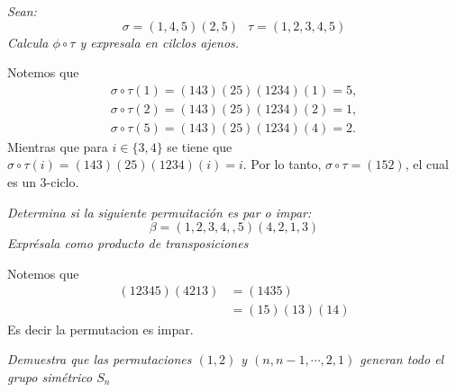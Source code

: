\documentclass[11pt,letterpaper]{article}
\begin{document}
\begin{tcolorbox}[
	title = \textcolor{black}{\textcolor{white}{Problema 1}},]
\textit{Sean:
\begin{equation*}
    \sigma=(1,4,5)(2,5)\,\,\,\:\tau=(1,2,3,4,5)
\end{equation*}
Calcula $\phi\circ \tau$ y expresala en cilclos ajenos.
} 
\end{tcolorbox}
\begin{Solucion}
    Notemos que 
    \begin{align*}
        \sigma \circ \tau (1)=(143)(25)(1234) (1)=5, \\
        \sigma \circ \tau (2)=(143)(25)(1234) (2)=1, \\
        \sigma \circ \tau (5)=(143)(25)(1234) (4)=2.
    \end{align*}
    Mientras que para \( i \in \{3,4\} \) se tiene que \(\sigma \circ \tau (i)=(143)(25)(1234) (i)=i\). Por lo tanto, \(\sigma \circ \tau = (152)\), el cual es un 3-ciclo.
\end{Solucion}
\begin{tcolorbox}[
	title = \textcolor{black}{\textcolor{white}{Problema 2}},]
\textit{Determina si la siguiente permuitaci\'on es par o impar:
\begin{equation*}
    \beta=(1,2,3,4,,5)(4,2,1,3)
\end{equation*}
Expr\'esala como producto de transposiciones 
}
\end{tcolorbox}
\begin{Solucion}
    Notemos que 
    \begin{align*}
       (12345)(4213)&=(1435)\\
       &=(15)(13)(14)
    \end{align*}
    Es decir la permutacion es impar.
\end{Solucion}
\newpage
\begin{tcolorbox}[
	title = \textcolor{black}{\textcolor{white}{Problema 3}},]
\textit{Demuestra que las permutaciones $(1,2)$ y $(n,n-1,\cdots,2,1)$ generan todo el grupo sim\'etrico $S_n$
}
\end{tcolorbox}
\end{document}

